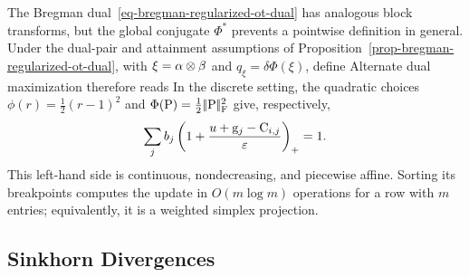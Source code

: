 The Bregman dual~\eqref{eq-bregman-regularized-ot-dual} has analogous block transforms, but the global conjugate $\Phi^*$ prevents a pointwise definition in general. Under the dual-pair and attainment assumptions of Proposition~\ref{prop-bregman-regularized-ot-dual}, with $\xi=\alpha\otimes\beta$ and $q_\xi=\delta\Phi(\xi)$, define
Alternate dual maximization therefore reads
In the discrete setting, the quadratic choices $\phi(r)=\frac12(r-1)^2$ and $\Phi(\mathrm{P})=\frac12|\!| \mathrm{P} |\!|_{\mathrm F}^2$ give, respectively,
\[
\sum_j b_j\left(1+\frac{u+\mathrm{g}_j-\mathrm{C}_{i,j}}{\varepsilon}\right)_+=1.
\]
This left-hand side is continuous, nondecreasing, and piecewise affine. Sorting its breakpoints computes the update in $O(m\log m)$ operations for a row with $m$ entries; equivalently, it is a weighted simplex projection.

\subsection{Sinkhorn Divergences}
\label{sec-sinkhorn-div}

